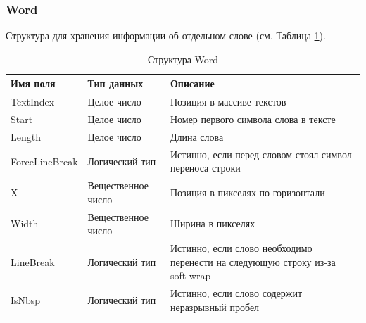 \documentclass{fefu}
\begin{document}
			\subsubsection{Word}
				\par Структура для хранения информации об отдельном слове (см. Таблица 
				\ref{table:Word}).
				\begin{table}[h]
					\centering
					\begin{tabular}{|l|l|p{9cm}|}
						\hline
						\textbf{Имя поля} & \textbf{Тип данных} & \textbf{Описание} \\
						\hline
						TextIndex & Целое число & Позиция в массиве текстов \\
						\hline
						Start & Целое число & Номер первого символа слова в тексте \\
						\hline
						Length & Целое число & Длина слова \\
						\hline
						ForceLineBreak & Логический тип & Истинно, если перед словом стоял
						символ переноса строки\\
						\hline 
						X & Вещественное число & Позиция в пикселях по горизонтали \\
						\hline 
						Width & Вещественное число & Ширина в пикселях \\
						\hline
						LineBreak & Логический тип & Истинно, если слово необходимо перенести
						на следующую строку из-за soft-wrap \\
						\hline
						IsNbsp & Логический тип & Истинно, если слово содержит неразрывный
						пробел\\
						\hline
					\end{tabular}
					\caption{Структура Word}
					\label{table:Word}
				\end{table}
\end{document}

